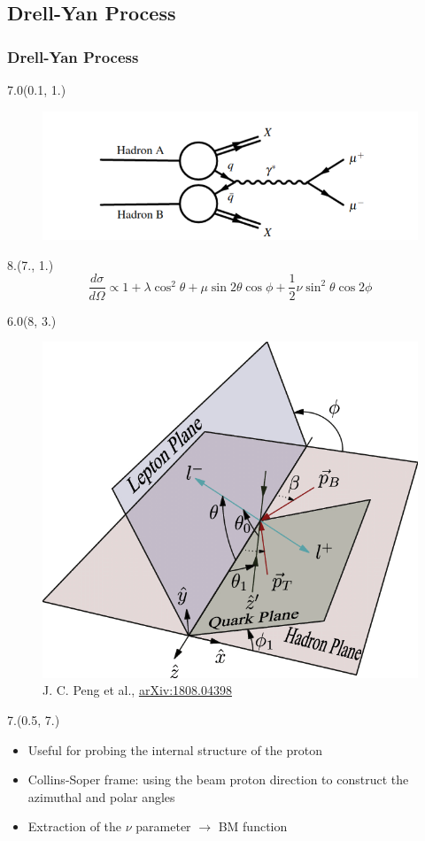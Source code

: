 \documentclass[12pt, xcolor={dvipsnames}, aspectratio = 169, sans, mathserif]{beamer}
\newenvironment{List}[2]
{\begin{textblock}{#1}#2
\begin{itemize}}
{\end{itemize}
\end{textblock}}
\newenvironment{Pic}[2]
{\begin{textblock}{#1}#2
\begin{figure}}
{\end{figure}
\end{textblock}}
\newcommand{\NewCaption}[3]{\caption{{#1}, \textcolor{blue}{\href{#2}{#3}}}}
\begin{document}
\subsection{Drell-Yan Process}
\begin{frame}
\frametitle{Drell-Yan Process}

\begin{Pic}{7.0}{(0.1, 1.)}
  \includegraphics[width=7.cm]{imgs/drell-yan.png}
\end{Pic}

\begin{textblock}{8.}(7., 1.)
\begin{equation*}
\frac{d\sigma}{d\Omega} \propto 1  + \lambda \cos^{2}\theta + \mu \sin 2 \theta \cos \phi + \frac{1}{2}\nu \sin^{2}\theta \cos 2 \phi
\end{equation*}
\end{textblock}

\begin{Pic}{6.0}{(8, 3.)}
  \NewCaption{J. C. Peng et al.}{https://arxiv.org/abs/1808.04398}{arXiv:1808.04398}
  \includegraphics[width=6.cm]{imgs/three_plane_newest.png}
\end{Pic}

\begin{List}{7.}{(0.5, 7.)}

  \item Useful for probing the internal structure of the proton

  \item Collins-Soper frame: using the beam proton direction to construct the azimuthal and polar angles

  \item Extraction of the $\nu$ parameter $\rightarrow$ BM function

\end{List}
\end{frame}
\end{document}
